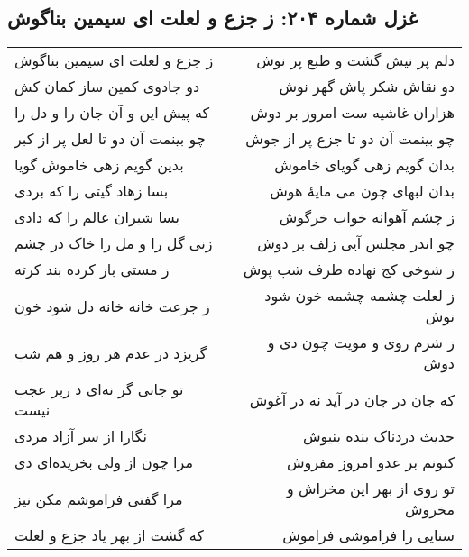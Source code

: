 \begin{center}
\section*{غزل شماره ۲۰۴: ز جزع و لعلت ای سیمین بناگوش}
\label{sec:204}
\begin{longtable}{l p{0.5cm} r}
ز جزع و لعلت ای سیمین بناگوش
&&
دلم پر نیش گشت و طبع پر نوش
\\
دو جادوی کمین ساز کمان کش
&&
دو نقاش شکر پاش گهر نوش
\\
که پیش این و آن جان را و دل را
&&
هزاران غاشیه ست امروز بر دوش
\\
چو بینمت آن دو تا لعل پر از کبر
&&
چو بینمت آن دو تا جزع پر از جوش
\\
بدین گویم زهی خاموش گویا
&&
بدان گویم زهی گویای خاموش
\\
بسا زهاد گیتی را که بردی
&&
بدان لبهای چون می مایهٔ هوش
\\
بسا شیران عالم را که دادی
&&
ز چشم آهوانه خواب خرگوش
\\
زنی گل را و مل را خاک در چشم
&&
چو اندر مجلس آیی زلف بر دوش
\\
ز مستی باز کرده بند کرته
&&
ز شوخی کج نهاده طرف شب پوش
\\
ز جزعت خانه خانه دل شود خون
&&
ز لعلت چشمه چشمه خون شود نوش
\\
گریزد در عدم هر روز و هم شب
&&
ز شرم روی و مویت چون دی و دوش
\\
تو جانی گر نه‌ای د ربر عجب نیست
&&
که جان در جان در آید نه در آغوش
\\
نگارا از سر آزاد مردی
&&
حدیث دردناک بنده بنیوش
\\
مرا چون از ولی بخریده‌ای دی
&&
کنونم بر عدو امروز مفروش
\\
مرا گفتی فراموشم مکن نیز
&&
تو روی از بهر این مخراش و مخروش
\\
که گشت از بهر یاد جزع و لعلت
&&
سنایی را فراموشی فراموش
\\
\end{longtable}
\end{center}
